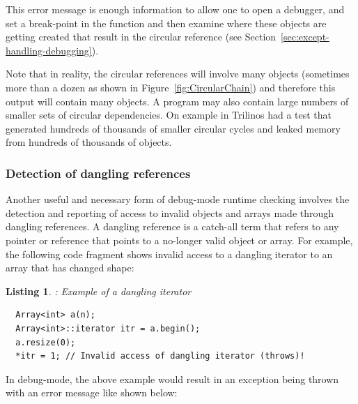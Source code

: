 \documentclass[pdf,ps2pdf,11pt]{SANDreport}
\newtheorem{listing}{Listing}
\begin{document}
This error message is enough information to allow one to open a
debugger, and set a break-point in the function
{} and then examine where these
objects are getting created that result in the circular reference (see
Section~\ref{sec:except-handling-debugging}).

Note that in reality, the circular references will involve many
objects (sometimes more than a dozen as shown in
Figure~\ref{fig:CircularChain}) and therefore this output will contain
many {} objects.  A program may also contain large
numbers of smaller sets of circular dependencies.  On example in
Trilinos had a test that generated hundreds of thousands of smaller
circular cycles and leaked memory from hundreds of thousands of
objects.


%
{}\subsubsection{Detection of dangling references}
\label{sec:detection-dangling-references}
%

Another useful and necessary form of debug-mode runtime checking
involves the detection and reporting of access to invalid objects and
arrays made through dangling references.  A dangling reference is a
catch-all term that refers to any pointer or reference that points to
a no-longer valid object or array.  For example, the following code
fragment shows invalid access to a dangling iterator to an array that
has changed shape:

\begin{listing}: Example of a dangling iterator \\
\label{listing:Array-dangling-iterator}
{\small\begin{verbatim}
  Array<int> a(n);
  Array<int>::iterator itr = a.begin();
  a.resize(0);
  *itr = 1; // Invalid access of dangling iterator (throws)!
\end{verbatim}}
\end{listing}

In debug-mode, the above example would result in an exception being
thrown with an error message like shown below:
\end{document}
